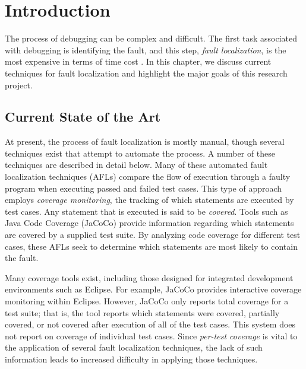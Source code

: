 %
%

\chapter{Introduction}\label{ch:intro} %

The process of debugging can be complex and difficult.  The first task
associated with debugging is identifying the fault, and this step,
\emph{fault localization}, is the most expensive in terms of time cost
\cite{harrold}. In this chapter, we discuss current techniques for
fault localization and highlight the major goals of this
research project.

\section{Current State of the Art}\label{sec:state}
At present, the process of fault localization is mostly
manual, though several techniques exist that attempt to automate the
process.  A number of these techniques are described in detail below.
Many of these automated fault localization techniques (AFLs) compare the
flow of execution through a faulty program when executing passed and
failed test cases.  This type of approach employs \emph{coverage
monitoring}, the tracking of which statements are executed by test
cases.  Any statement that is executed is said to be \emph{covered}.
Tools such as Java Code Coverage (JaCoCo) \cite{jacoco} provide
information regarding which statements are covered by a supplied test
suite.  By analyzing code coverage for different test cases, these AFLs
seek to determine which statements are most likely to contain the fault.

Many coverage tools exist, including those designed for integrated development
environments such as Eclipse.  For example, JaCoCo provides interactive
coverage monitoring within Eclipse.  However, JaCoCo only reports total
coverage for a test suite; that is, the tool reports which statements
were covered, partially covered, or not covered after execution of all
of the test cases.  This system does not report on coverage of
individual test cases.  Since \emph{per-test coverage} is vital to the
application of several fault localization techniques, the lack of such
information leads to increased difficulty in applying those techniques.

